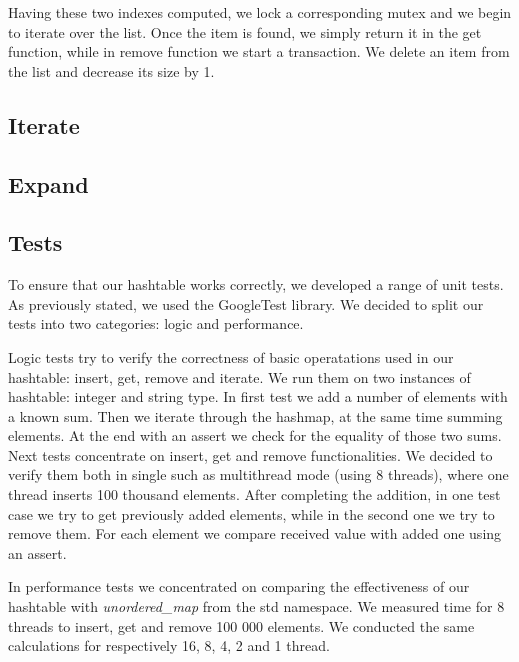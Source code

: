     Having these two indexes computed, we lock a corresponding mutex and we begin to iterate over the list. Once the item is found, we simply return it in the get function, while in remove function we start a transaction. We delete an item from the list and decrease its size by 1.
        
        
\subsection{Iterate}
    
\subsection{Expand}

\subsection{Tests}

    To ensure that our hashtable works correctly, we developed a range of unit tests. As previously stated, we used the GoogleTest library. We decided to split our tests into two categories: logic and performance.
    
    Logic tests try to verify the correctness of basic operatations used in our hashtable: insert, get, remove and iterate. We run them on two instances of hashtable: integer and string type. In first test we add a number of elements with a known sum. Then we iterate through the hashmap, at the same time summing elements. At the end with an assert we check for the equality of those two sums. Next tests concentrate on insert, get and remove functionalities. We decided to verify them both in single such as multithread mode (using 8 threads), where one thread inserts 100 thousand elements. After completing the addition, in one test case we try to get previously added elements, while in the second one we try to remove them. For each element we compare received value with added one using an assert.
    
    In performance tests we concentrated on comparing the effectiveness of our hashtable with \textit{unordered\_map} from the std namespace. We measured time for 8 threads to insert, get and remove 100 000 elements. We conducted the same calculations for respectively 16, 8, 4, 2 and 1 thread. 

